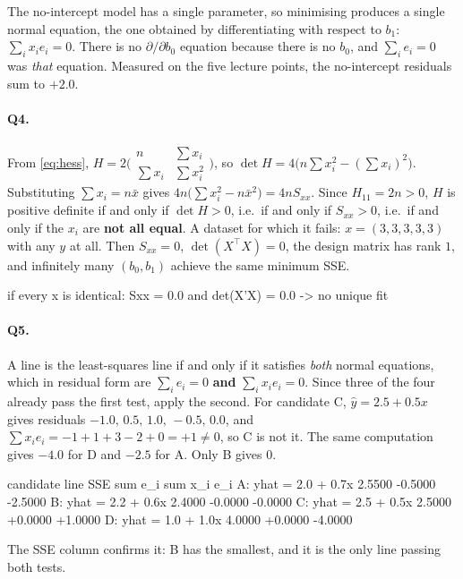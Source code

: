 \documentclass[11pt]{article}
\begin{document}
The no-intercept model has a single parameter, so minimising produces a single
normal equation, the one obtained by differentiating with respect to $b_1$:
$\sum_i x_ie_i = 0$. There is no $\partial/\partial b_0$ equation because
there is no $b_0$, and $\sum_i e_i = 0$ was \emph{that} equation. Measured on
the five lecture points, the no-intercept residuals sum to $+2.0$.

\paragraph{Q4.} From \eqref{eq:hess},
$H = 2\bigl(\begin{smallmatrix} n & \sum x_i\\ \sum x_i & \sum x_i^2
\end{smallmatrix}\bigr)$, so
$\det H = 4\bigl(n\sum x_i^2 - (\sum x_i)^2\bigr)$. Substituting
$\sum x_i = n\bar x$ gives
$4n\bigl(\sum x_i^2 - n\bar x^2\bigr) = 4nS_{xx}$. Since $H_{11} = 2n > 0$,
$H$ is positive definite if and only if $\det H > 0$, i.e.\ if and only if
$S_{xx} > 0$, i.e.\ if and only if the $x_i$ are \textbf{not all equal}. A
dataset for which it fails: $x = (3,3,3,3,3)$ with any $y$ at all. Then
$S_{xx} = 0$, $\det(X^{\!\top}\!X) = 0$, the design matrix has rank $1$, and
infinitely many $(b_0,b_1)$ achieve the same minimum SSE.
\begin{codeout}
if every x is identical: Sxx = 0.0 and det(X'X) = 0.0 -> no unique fit
\end{codeout}

\paragraph{Q5.} A line is the least-squares line if and only if it satisfies
\emph{both} normal equations, which in residual form are $\sum_i e_i = 0$
\textbf{and} $\sum_i x_ie_i = 0$. Since three of the four already pass the
first test, apply the second. For candidate C, $\hat y = 2.5+0.5x$ gives
residuals $-1.0,\,0.5,\,1.0,\,-0.5,\,0.0$, and
$\sum x_ie_i = -1 + 1 + 3 - 2 + 0 = +1 \ne 0$, so C is not it. The same
computation gives $-4.0$ for D and $-2.5$ for A. Only B gives $0$.
\begin{codeout}
candidate line            SSE     sum e_i    sum x_i e_i
A: yhat = 2.0 + 0.7x    2.5500    -0.5000        -2.5000
B: yhat = 2.2 + 0.6x    2.4000    -0.0000        -0.0000
C: yhat = 2.5 + 0.5x    2.5000    +0.0000        +1.0000
D: yhat = 1.0 + 1.0x    4.0000    +0.0000        -4.0000
\end{codeout}
The SSE column confirms it: B has the smallest, and it is the only line
passing both tests.
\end{document}

